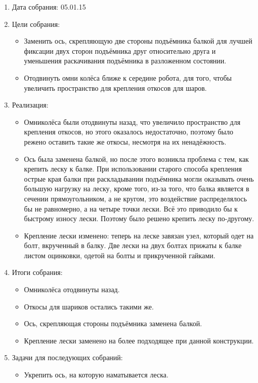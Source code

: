 \begin{enumerate}
  	
  \item Дата собрания: 05.01.15
	
  \item Цели собрания: 
  \begin{itemize}
    \item Заменить ось, скрепляющую две стороны подъёмника балкой для лучшей фиксации двух сторон подъёмника друг относительно друга и уменьшения раскачивания подъёмника в разложенном состоянии.
		
	\item Отодвинуть омни колёса ближе к середине робота, для того, чтобы увеличить пространство для крепления откосов для шаров.
		
  \end{itemize}

  \item Реализация:
  \begin{itemize}
    \item Омниколёса были отодвинуты назад, что увеличило пространство для крепления откосов, но этого оказалось недостаточно, поэтому было режено оставить такие же откосы, несмотря на их ненадёжность.
		
	\item Ось была заменена балкой, но после этого возникла проблема с тем, как крепить леску к балке. При использовании старого способа крепления острые края балки при раскладывании подъёмника могли оказывать очень большую нагрузку на леску, кроме того, из-за того, что балка является в сечении прямоугольником, а не кругом, это воздействие распределялось бы не равномерно, а на четыре точки лески. Всё это приводило бы к быстрому износу лески. Поэтому было решено крепить леску по-другому.
		
    \item Крепление лески изменено: теперь на леске завязан узел, который одет на болт, вкрученный в балку. Две лески на двух болтах прижаты к балке листом оцинковки, одетой на болты и прикрученной гайками.
		
  \end{itemize}
	
  \item Итоги собрания:
  \begin{itemize}
	\item Омниколёса отодвинуты назад.
    
    \item Откосы для шариков остались такими же.
    
	\item Ось, скрепляющая стороны подъёмника заменена балкой.
	
	\item Крепление лески заменено на более подходящее при данной конструкции.
  \end{itemize}
	
  \item Задачи для последующих собраний:
  \begin{itemize}
    \item Укрепить ось, на которую наматывается леска.
  \end{itemize}
\end{enumerate}
\fillpage
